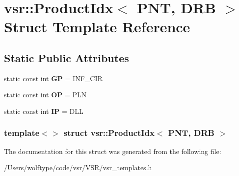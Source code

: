 \hypertarget{structvsr_1_1_product_idx_3_01_p_n_t_00_01_d_r_b_01_4}{\section{vsr\-:\-:Product\-Idx$<$ P\-N\-T, D\-R\-B $>$ Struct Template Reference}
\label{structvsr_1_1_product_idx_3_01_p_n_t_00_01_d_r_b_01_4}
}
\subsection*{Static Public Attributes}
\begin{DoxyCompactItemize}
\item 
\hypertarget{structvsr_1_1_product_idx_3_01_p_n_t_00_01_d_r_b_01_4_a349676b72f84c81c85f9fab04b24ac15}{static const int {\bfseries G\-P} = I\-N\-F\-\_\-\-C\-I\-R}\label{structvsr_1_1_product_idx_3_01_p_n_t_00_01_d_r_b_01_4_a349676b72f84c81c85f9fab04b24ac15}

\item 
\hypertarget{structvsr_1_1_product_idx_3_01_p_n_t_00_01_d_r_b_01_4_af8b8f4eb22e89ef7e2a3a5f8cf1f4479}{static const int {\bfseries O\-P} = P\-L\-N}\label{structvsr_1_1_product_idx_3_01_p_n_t_00_01_d_r_b_01_4_af8b8f4eb22e89ef7e2a3a5f8cf1f4479}

\item 
\hypertarget{structvsr_1_1_product_idx_3_01_p_n_t_00_01_d_r_b_01_4_aebabbe1dcc3f7e61b6b6f4509a688f60}{static const int {\bfseries I\-P} = D\-L\-L}\label{structvsr_1_1_product_idx_3_01_p_n_t_00_01_d_r_b_01_4_aebabbe1dcc3f7e61b6b6f4509a688f60}

\end{DoxyCompactItemize}
\subsubsection*{template$<$$>$ struct vsr\-::\-Product\-Idx$<$ P\-N\-T, D\-R\-B $>$}



The documentation for this struct was generated from the following file\-:\begin{DoxyCompactItemize}
\item 
/\-Users/wolftype/code/vsr/\-V\-S\-R/vsr\-\_\-templates.\-h\end{DoxyCompactItemize}
